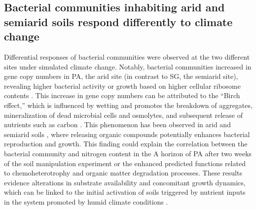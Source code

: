\subsection{Bacterial communities inhabiting arid and semiarid soils respond differently to climate change}

Differential responses of bacterial communities were observed at the two different sites under simulated climate change. Notably, bacterial communities increased in gene copy numbers in PA, the arid site (in contrast to SG, the semiarid site), revealing higher bacterial activity or growth based on higher cellular ribosome contents \citep{Placella2012}. This increase in gene copy numbers can be attributed to the ``Birch effect,'' which is influenced by wetting and promotes the breakdown of aggregates, mineralization of dead microbial cells and osmolytes, and subsequent release of nutrients such as carbon \citep{Jarvis2007}. This phenomenon has been observed in arid and semiarid soils \citep{Armstrong2016, Seuss2022}, where releasing organic compounds potentially enhances bacterial reproduction and growth. This finding could explain the correlation between the bacterial community and nitrogen content in the A horizon of PA after two weeks of the soil manipulation experiment or the enhanced predicted functions related to chemoheterotrophy and organic matter degradation processes. These results evidence alterations in substrate availability and concomitant growth dynamics, which can be linked to the initial activation of soils triggered by nutrient inputs in the system promoted by humid climate conditions \citep{Nemergut2016, ChenLeung2021}.

